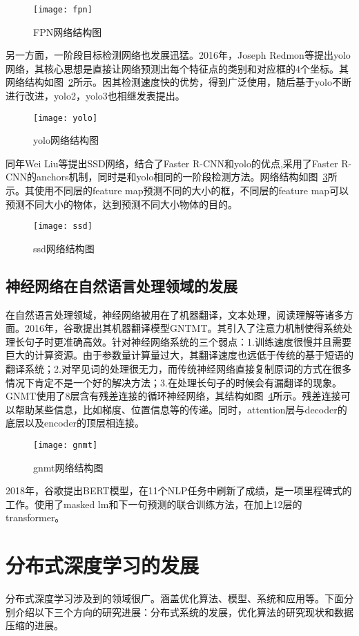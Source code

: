 \begin{figure}[htp]
\centering
\texttt{[image: fpn]}
\caption{FPN网络结构图}
\label{fig:fpn}
\end{figure}
另一方面，一阶段目标检测网络也发展迅猛。2016年，Joseph Redmon等提出yolo网络，其核心思想是直接让网络预测出每个特征点的类别和对应框的4个坐标。其网络结构如图~\ref{fig:yolo}所示。因其检测速度快的优势，得到广泛使用，随后基于yolo不断进行改进，yolo2，yolo3也相继发表提出。

\begin{figure}[htp]
\centering
\texttt{[image: yolo]}
\caption{yolo网络结构图}
\label{fig:yolo}
\end{figure}
同年Wei Liu等提出SSD网络，结合了Faster R-CNN和yolo的优点,采用了Faster R-CNN的anchors机制，同时是和yolo相同的一阶段检测方法。网络结构如图~\ref{fig:ssd}所示。其使用不同层的feature map预测不同的大小的框，不同层的feature map可以预测不同大小的物体，达到预测不同大小物体的目的。

\begin{figure}[htp]
\centering
\texttt{[image: ssd]}
\caption{ssd网络结构图}
\label{fig:ssd}
\end{figure}
\subsection{神经网络在自然语言处理领域的发展}
在自然语言处理领域，神经网络被用在了机器翻译，文本处理，阅读理解等诸多方面。2016年，谷歌提出其机器翻译模型GNTMT。其引入了注意力机制使得系统处理长句子时更准确高效。针对神经网络系统的三个弱点：1.训练速度很慢并且需要巨大的计算资源。由于参数量计算量过大，其翻译速度也远低于传统的基于短语的翻译系统；2.对罕见词的处理很无力，而传统神经网络直接复制原词的方式在很多情况下肯定不是一个好的解决方法；3.在处理长句子的时候会有漏翻译的现象。GNMT使用了8层含有残差连接的循环神经网络，其结构如图~\ref{fig:gnmt}所示。残差连接可以帮助某些信息，比如梯度、位置信息等的传递。同时，attention层与decoder的底层以及encoder的顶层相连接。

\begin{figure}[htp]
\centering
\texttt{[image: gnmt]}
\caption{gnmt网络结构图}
\label{fig:gnmt}
\end{figure}
2018年，谷歌提出BERT模型，在11个NLP任务中刷新了成绩，是一项里程碑式的工作。使用了masked lm和下一句预测的联合训练方法，在加上12层的transformer。
\section{分布式深度学习的发展}
分布式深度学习涉及到的领域很广。涵盖优化算法、模型、系统和应用等。下面分别介绍以下三个方向的研究进展：分布式系统的发展，优化算法的研究现状和数据压缩的进展。
